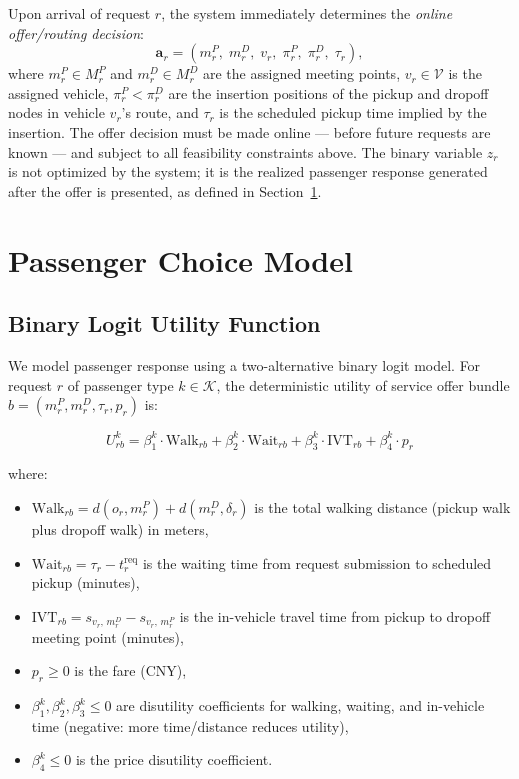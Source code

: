 Upon arrival of request $r$, the system immediately determines the \emph{online
offer/routing decision}:
\begin{equation}\label{eq:decvec}
  \mathbf{a}_r = (m_r^P,\; m_r^D,\; v_r,\; \pi_r^P,\; \pi_r^D,\; \tau_r),
\end{equation}
where $m_r^P \in M_r^P$ and $m_r^D \in M_r^D$ are the assigned meeting points,
$v_r \in \mathcal{V}$ is the assigned vehicle, $\pi_r^P < \pi_r^D$ are the
insertion positions of the pickup and dropoff nodes in vehicle $v_r$'s route,
and $\tau_r$ is the scheduled pickup time implied by the insertion. The offer
decision must be made online --- before future requests are known --- and
subject to all feasibility constraints above. The binary variable $z_r$ is not
optimized by the system; it is the realized passenger response generated after
the offer is presented, as defined in Section~\ref{sec:choice}.

\section{Passenger Choice Model}\label{sec:choice}

\subsection{Binary Logit Utility Function}

We model passenger response using a two-alternative binary logit model. For request $r$ of
passenger type $k \in \mathcal{K}$, the deterministic utility of service offer bundle
$b = (m_r^P, m_r^D, \tau_r, p_r)$ is:

\begin{equation}\label{eq:utility}
  U_{rb}^k = \beta_1^k \cdot \text{Walk}_{rb} + \beta_2^k \cdot \text{Wait}_{rb}
           + \beta_3^k \cdot \text{IVT}_{rb} + \beta_4^k \cdot p_r
\end{equation}

where:
\begin{itemize}
  \item $\text{Walk}_{rb} = d(o_r, m_r^P) + d(m_r^D, \delta_r)$ is the total walking
        distance (pickup walk plus dropoff walk) in meters,
  \item $\text{Wait}_{rb} = \tau_r - t_r^{\text{req}}$ is the waiting time from request
        submission to scheduled pickup (minutes),
  \item $\text{IVT}_{rb} = s_{v_r,\, m_r^D} - s_{v_r,\, m_r^P}$ is the in-vehicle travel
        time from pickup to dropoff meeting point (minutes),
  \item $p_r \geq 0$ is the fare (CNY),
  \item $\beta_1^k, \beta_2^k, \beta_3^k \leq 0$ are disutility coefficients for walking,
        waiting, and in-vehicle time (negative: more time/distance reduces utility),
  \item $\beta_4^k \leq 0$ is the price disutility coefficient.
\end{itemize}

